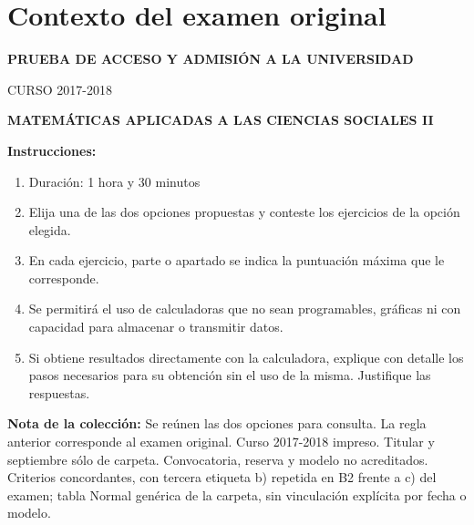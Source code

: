 \section*{Contexto del examen original}
\textbf{PRUEBA DE ACCESO Y ADMISIÓN A LA UNIVERSIDAD}\par
CURSO 2017-2018\par
\textbf{MATEMÁTICAS APLICADAS A LAS CIENCIAS SOCIALES II}

\textbf{Instrucciones:}
\begin{enumerate}[label=\textbf{\alph*)}]
  \item Duración: 1 hora y 30 minutos
  \item Elija una de las dos opciones propuestas y conteste los ejercicios de la opción elegida.
  \item En cada ejercicio, parte o apartado se indica la puntuación máxima que le corresponde.
  \item Se permitirá el uso de calculadoras que no sean programables, gráficas ni con capacidad para almacenar o transmitir datos.
  \item Si obtiene resultados directamente con la calculadora, explique con detalle los pasos necesarios para su obtención sin el uso de la misma. Justifique las respuestas.
\end{enumerate}
\noindent\textbf{Nota de la colección:} Se reúnen las dos opciones para consulta. La regla anterior corresponde al examen original. Curso 2017-2018 impreso. Titular y septiembre sólo de carpeta. Convocatoria, reserva y modelo no acreditados. Criterios concordantes, con tercera etiqueta b) repetida en B2 frente a c) del examen; tabla Normal genérica de la carpeta, sin vinculación explícita por fecha o modelo.
\par\medskip
